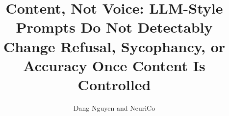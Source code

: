 \documentclass{article}
\title{Content, Not Voice: LLM-Style Prompts Do Not Detectably Change Refusal, Sycophancy, or Accuracy Once Content Is Controlled}
\author{Dang Nguyen and NeuriCo}
\begin{document}
\maketitle

\begin{abstract}

\end{abstract}










\appendix

\end{document}
